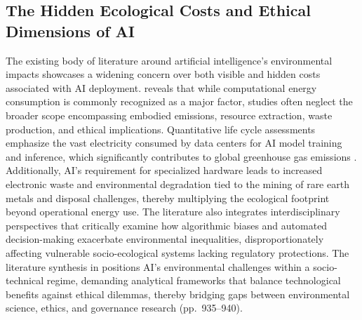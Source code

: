 \documentclass[a4paper, 12pt]{article}
\begin{document}
\subsection{The Hidden Ecological Costs and Ethical Dimensions of AI}
The existing body of literature around artificial intelligence's environmental impacts showcases a widening concern over both visible and hidden costs associated with AI deployment. \citet{Zhuk2023} reveals that while computational energy consumption is commonly recognized as a major factor, studies often neglect the broader scope encompassing embodied emissions, resource extraction, waste production, and ethical implications. Quantitative life cycle assessments emphasize the vast electricity consumed by data centers for AI model training and inference, which significantly contributes to global greenhouse gas emissions \citep{Zhuk2023}. Additionally, AI's requirement for specialized hardware leads to increased electronic waste and environmental degradation tied to the mining of rare earth metals and disposal challenges, thereby multiplying the ecological footprint beyond operational energy use. The literature also integrates interdisciplinary perspectives that critically examine how algorithmic biases and automated decision-making exacerbate environmental inequalities, disproportionately affecting vulnerable socio-ecological systems lacking regulatory protections. The literature synthesis in \citet{Zhuk2023} positions AI's environmental challenges within a socio-technical regime, demanding analytical frameworks that balance technological benefits against ethical dilemmas, thereby bridging gaps between environmental science, ethics, and governance research (pp.~935--940).
\end{document}
